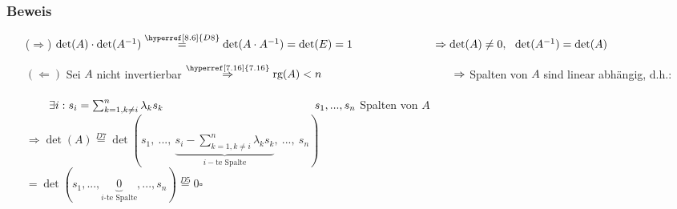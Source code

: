 \documentclass[a4paper, 12pt,titlepage, pdf, headsepline]{article}
\newcommand{\rg}{\textrm{rg}}
\newcommand{\qed}{\hfill$\square$}
\renewcommand{\>}{\rightarrow}
\renewcommand{\*}{\cdot}
\begin{document}
\subsubsection*{Beweis}
\begin{itemize}
	\item[($\Rightarrow$)] $\det(A) \cdot \det(A^{-1}) \overset{\hyperref[8.6]{D8}}{=} \det(A \cdot A^{-1}) = \det(E) = 1\\
	\noindent\hspace*{25mm} \Rightarrow \det(A) \neq 0 ,~~ \det(A^{-1}) = \det(A)$
	\item[$(\Leftarrow)$] Sei $A$ nicht invertierbar $\overset{\hyperref[7.16]{7.16}}{\Rightarrow} \rg(A) < n \\
	\noindent\hspace*{40.5mm}\Rightarrow$ Spalten von $A$ sind linear abhängig, d.h.:\\
	\\
	\noindent\hspace*{40.5mm}$\qquad\exists i: s_i = \sum_{k = 1, k\neq i}^{n} \lambda_k s_k\\\noindent\hspace*{40.5mm}\qquad s_1,...,s_n$ Spalten von $A$ \\
	\noindent\hspace*{40.5mm}$\Rightarrow \det(A) \overset{\hyperref[8.6]{D7}}{=} \det(s_1,~...,~\underbrace{s_i - \sum_{k = 1, k\neq i}^{n} \lambda_k s_k}_{i-\text{te Spalte}},~...,~s_n)$\\
	\noindent\hspace*{57.5mm}$= \det(s_1,...,\underbrace{0}_{i\text{-te Spalte}},...,s_n) \overset{\hyperref[8.6]{D5}}{=} 0$\qed
\end{itemize}
\end{document}
